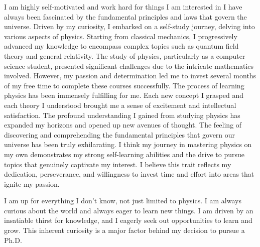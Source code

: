 
\begin{cventries}

	\cventry
	{} %
	{I am highly self-motivated and work hard for things I am interested in} %
	{\hfill} %
	{} %
	{
		\quad I have always been fascinated by the fundamental principles and laws that govern the universe. Driven by my curiosity, I embarked on a self-study journey, delving into various aspects of physics. Starting from classical mechanics, I progressively advanced my knowledge to encompass complex topics such as quantum field theory and general relativity. The study of physics, particularly as a computer science student, presented significant challenges due to the intricate mathematics involved. However, my passion and determination led me to invest several months of my free time to complete these courses successfully. \newline
		\quad The process of learning physics has been immensely fulfilling for me. Each new concept I grasped and each theory I understood brought me a sense of excitement and intellectual satisfaction. The profound understanding I gained from studying physics has expanded my horizons and opened up new avenues of thought. The feeling of discovering and comprehending the fundamental principles that govern our universe has been truly exhilarating. \newline
		\quad I think my journey in mastering physics on my own demonstrates my strong self-learning abilities and the drive to pursue topics that genuinely captivate my interest. I believe this trait reflects my dedication, perseverance, and willingness to invest time and effort into areas that ignite my passion. \newline
		\vspace{-3.5mm}
	}

	\cventry
	{} %
	{I am up for everything I don't know, not just limited to physics.} %
	{\hfill} %
	{} %
	{
		\quad I am always curious about the world and always eager to learn new things. I am driven by an insatiable thirst for knowledge, and I eagerly seek out opportunities to learn and grow. This inherent curiosity is a major factor behind my decision to pursue a Ph.D. \newline
	}
\end{cventries}
